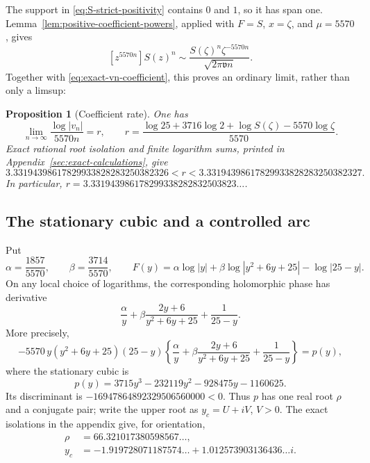 \documentclass[11pt,reqno,letterpaper]{amsart}
\numberwithin{equation}{section}
\newtheorem{proposition}[theorem]{Proposition}
\theoremstyle{definition}
\theoremstyle{remark}
\begin{document}
The support in \eqref{eq:S-strict-positivity} contains \(0\) and \(1\),
so it has span one.  Lemma~\ref{lem:positive-coefficient-powers}, applied
with \(F=S\), \(x=\zeta\), and \(\mu=5570\), gives
\begin{equation}\label{eq:S-coefficient-asymptotic}
 [z^{5570n}]S(z)^n
 \sim\frac{S(\zeta)^n\zeta^{-5570n}}
 {\sqrt{2\pi\mathfrak v n}}.
\end{equation}
Together with \eqref{eq:exact-vn-coefficient}, this proves an ordinary
limit, rather than only a limsup:
\begin{proposition}[Coefficient rate]\label{prop:coefficient-rate}
One has
\begin{equation}\label{eq:r-definition}
 \lim_{n\to\infty}\frac{\log|v_n|}{5570n}=r,
 \qquad
 r=\frac{\log25+3716\log2+\log S(\zeta)-5570\log\zeta}
 {5570}.
\end{equation}
Exact rational root isolation and finite logarithm sums, printed in
Appendix~\ref{sec:exact-calculations}, give
\begin{equation}\label{eq:r-enclosure}
 3.33194398617829933828283250382326
 <r<
 3.33194398617829933828283250382327.
\end{equation}
In particular,
\(r=3.331943986178299338282832503823\ldots\).
\end{proposition}

\subsection{The stationary cubic and a controlled arc}

Put
\begin{equation}\label{eq:normalized-complex-phase}
 \alpha=\frac{1857}{5570},\qquad
 \beta=\frac{3714}{5570},\qquad
 F(y)=\alpha\log|y|+\beta\log|y^2+6y+25|-\log|25-y|.
\end{equation}
On any local choice of logarithms, the corresponding holomorphic phase
has derivative
\[
 \frac{\alpha}{y}+\beta\frac{2y+6}{y^2+6y+25}
 +\frac1{25-y}.
\]
More precisely,
\[
 -5570\,y(y^2+6y+25)(25-y)
 \left\{\frac{\alpha}{y}
 +\beta\frac{2y+6}{y^2+6y+25}+\frac1{25-y}\right\}=p(y),
\]
where the stationary cubic is
\begin{equation}\label{eq:stationary-cubic}
 p(y)=3715y^3-232119y^2-928475y-1160625.
\end{equation}
Its discriminant is
\(-16947864892329506560000<0\).  Thus \(p\) has one real root
\(\rho\) and a conjugate pair; write the upper root as
\(y_c=U+iV\), \(V>0\).  The exact isolations in the appendix give, for
orientation,
\[
 \begin{aligned}
 \rho&=66.321017380598567\ldots,\\
 y_c&=-1.919728071187574\ldots
      +1.012573903136436\ldots i.
 \end{aligned}
\]
\end{document}
